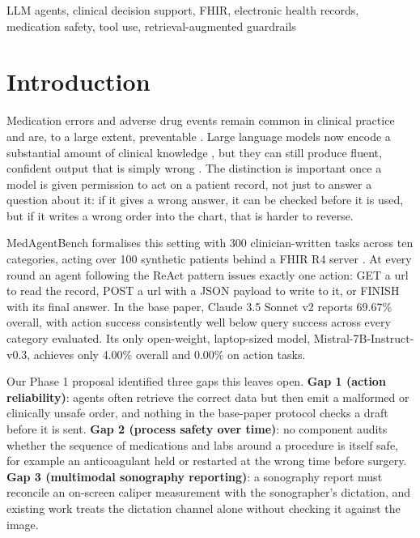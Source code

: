 \documentclass[conference]{IEEEtran}
\begin{document}
\begin{IEEEkeywords}
LLM agents, clinical decision support, FHIR, electronic health records, medication safety, tool use, retrieval-augmented guardrails
\end{IEEEkeywords}

\section{Introduction}

Medication errors and adverse drug events remain common in clinical practice and are, to a large extent, preventable \cite{bates1995ade}. Large language models now encode a substantial amount of clinical knowledge \cite{singhal2023medpalm}, but they can still produce fluent, confident output that is simply wrong \cite{ji2023hallucination}. The distinction is important once a model is given permission to act on a patient record, not just to answer a question about it: if it gives a wrong answer, it can be checked before it is used, but if it writes a wrong order into the chart, that is harder to reverse.

MedAgentBench \cite{jiang2025medagentbench} formalises this setting with 300 clinician-written tasks across ten categories, acting over 100 synthetic patients behind a FHIR R4 server \cite{bender2013fhir}. At every round an agent following the ReAct pattern \cite{yao2023react} issues exactly one action: GET a url to read the record, POST a url with a JSON payload to write to it, or FINISH with its final answer. In the base paper, Claude 3.5 Sonnet v2 reports 69.67\% overall, with action success consistently well below query success across every category evaluated. Its only open-weight, laptop-sized model, Mistral-7B-Instruct-v0.3, achieves only 4.00\% overall and 0.00\% on action tasks.

Our Phase 1 proposal identified three gaps this leaves open. \textbf{Gap 1 (action reliability)}: agents often retrieve the correct data but then emit a malformed or clinically unsafe order, and nothing in the base-paper protocol checks a draft before it is sent. \textbf{Gap 2 (process safety over time)}: no component audits whether the sequence of medications and labs around a procedure is itself safe, for example an anticoagulant held or restarted at the wrong time before surgery. \textbf{Gap 3 (multimodal sonography reporting)}: a sonography report must reconcile an on-screen caliper measurement with the sonographer's dictation, and existing work treats the dictation channel alone \cite{gertz2026dictation,hao2026ultrareporter} without checking it against the image.
\end{document}
